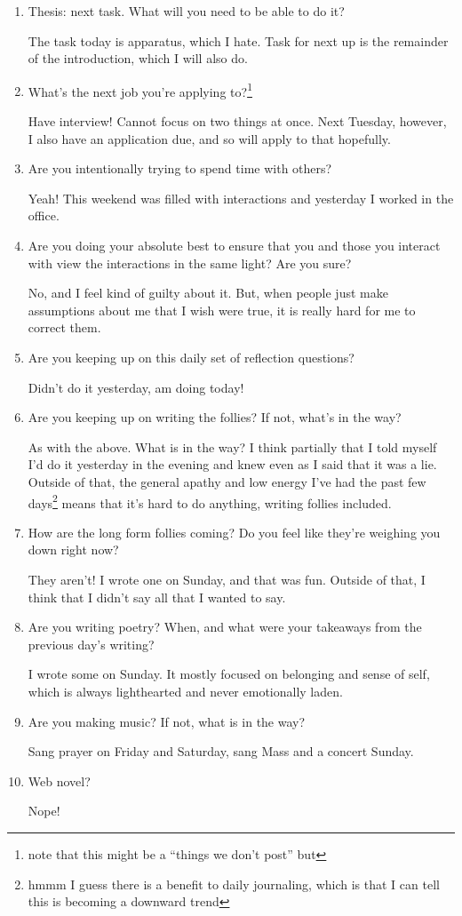 \documentclass[12pt]{article}
\newcommand{\say}[1]{``#1''}
\renewcommand{\,}{\textsuperscript{,}}
\begin{document}
\begin{enumerate}
\item Thesis: next task. What will you need to be able to do it?

The task today is apparatus, which I hate. Task for next up is the remainder of the introduction, which I will also do.

\item What's the next job you're applying to?\footnote{note that this might be a \say{things we don't post} but}

Have interview! Cannot focus on two things at once.  
Next Tuesday, however, I also have an application due, and so will apply to that hopefully.

\item Are you intentionally trying to spend time with others?

Yeah! This weekend was filled with interactions and yesterday I worked in the office.

\item Are you doing your absolute best to ensure that you and those you interact with view the interactions in the same light? Are you sure?

No, and I feel kind of guilty about it.  
But, when people just make assumptions about me that I wish were true, it is really hard for me to correct them.

\item Are you keeping up on this daily set of reflection questions?

Didn't do it yesterday, am doing today!

\item Are you keeping up on writing the follies? If not, what's in the way?

As with the above.  
What is in the way? I think partially that I told myself I'd do it yesterday in the evening and knew even as I said that it was a lie.  
Outside of that, the general apathy and low energy I've had the past few days\footnote{hmmm I guess there is a benefit to daily journaling, which is that I can tell this is becoming a downward trend} means that it's hard to do anything, writing follies included.

\item How are the long form follies coming? Do you feel like they're weighing you down right now?

They aren't! I wrote one on Sunday, and that was fun.  
Outside of that, I think that I didn't say all that I wanted to say.

\item Are you writing poetry? When, and what were your takeaways from the previous day's writing?

I wrote some on Sunday.  
It mostly focused on belonging and sense of self, which is always lighthearted and never emotionally laden.

\item Are you making music? If not, what is in the way?

Sang prayer on Friday and Saturday, sang Mass and a concert Sunday.

\item Web novel?

Nope!

\end{enumerate}
\end{document}
